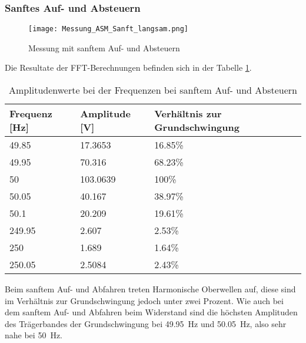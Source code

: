 \newpage
\subsubsection*{Sanftes Auf- und Absteuern}
\begin{figure}[ht!]
	\centering
	\texttt{[image: Messung\_ASM\_Sanft\_langsam.png]}	
	\caption{Messung mit sanftem Auf- und Absteuern}\label{fig:Mess_ASM_Sanft_langsam}
\end{figure}

Die Resultate der FFT-Berechnungen befinden sich in der Tabelle \ref{tab:Mess_Spannung_ASM_AufAb_sanft}. 


\begin{table}[ht!]
	\centering
	\begin{tabular}{|l|l|l|}
		\hline
		Frequenz {[}Hz{]} & Amplitude {[}V{]} & Verhältnis zur Grundschwingung \\ \hline
		49.85             & 17.3653           & 16.85\%                        \\ \hline
		49.95             & 70.316            & 68.23\%                        \\ \hline
		50                & 103.0639          & 100\%                          \\ \hline
		50.05             & 40.167            & 38.97\%                        \\ \hline
		50.1              & 20.209            & 19.61\%                        \\ \hline
		249.95            & 2.607             & 2.53\%                         \\ \hline
		250               & 1.689             & 1.64\%                         \\ \hline
		250.05            & 2.5084            & 2.43\%                         \\ \hline
	\end{tabular}
\caption{Amplitudenwerte bei der Frequenzen bei sanftem Auf- und Absteuern}\label{tab:Mess_Spannung_ASM_AufAb_sanft}
\end{table}

Beim sanftem Auf- und Abfahren treten Harmonische Oberwellen auf, diese sind im Verhältnis zur Grundschwingung jedoch unter zwei Prozent. Wie auch bei dem sanftem Auf- und Abfahren beim Widerstand sind die höchsten Amplituden des Trägerbandes der Grundschwingung bei \SI{49.95}{Hz} und \SI{50.05}{Hz}, also sehr nahe bei \SI{50}{Hz}.

\newpage

